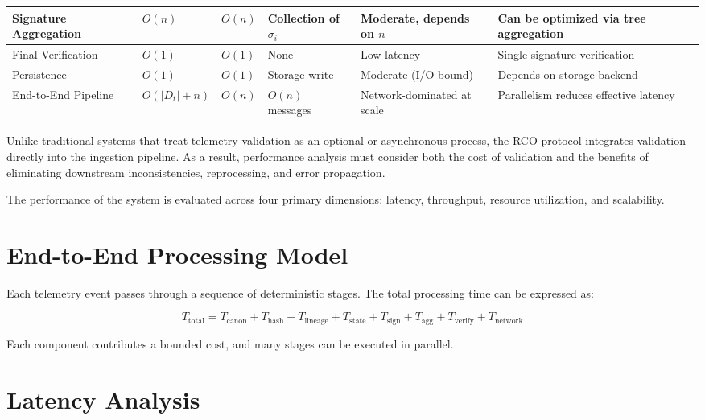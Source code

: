 \begin{table}[htbp]
\begin{tabularx}{\textwidth}{|p{3cm}|p{2.5cm}|p{2.5cm}|X|X|X|}
Signature Aggregation & $O(n)$ & $O(n)$ & Collection of $\sigma_i$ & Moderate, depends on $n$ & Can be optimized via tree aggregation \\

\hline

Final Verification & $O(1)$ & $O(1)$ & None & Low latency & Single signature verification \\

\hline

Persistence & $O(1)$ & $O(1)$ & Storage write & Moderate (I/O bound) & Depends on storage backend \\

\hline

End-to-End Pipeline & $O(|D_t| + n)$ & $O(n)$ & $O(n)$ messages & Network-dominated at scale & Parallelism reduces effective latency \\

\hline

\end{tabularx}
\end{table}

Unlike traditional systems that treat telemetry validation as an optional or asynchronous process, the RCO protocol integrates validation directly into the ingestion pipeline. As a result, performance analysis must consider both the cost of validation and the benefits of eliminating downstream inconsistencies, reprocessing, and error propagation.

The performance of the system is evaluated across four primary dimensions: latency, throughput, resource utilization, and scalability.

\section{End-to-End Processing Model}

Each telemetry event passes through a sequence of deterministic stages. The total processing time can be expressed as:

\begin{equation}
T_{\text{total}} = T_{\text{canon}} + T_{\text{hash}} + T_{\text{lineage}} + T_{\text{state}} + T_{\text{sign}} + T_{\text{agg}} + T_{\text{verify}} + T_{\text{network}}
\end{equation}

Each component contributes a bounded cost, and many stages can be executed in parallel.

\section{Latency Analysis}

